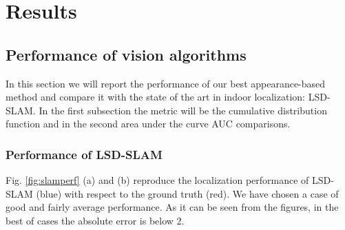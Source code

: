 \section{Results}
\label{sec:results}

\subsection{Performance of vision algorithms}
In this section we will report the performance of our best appearance-based method and compare it with the state of the art in indoor localization: LSD-SLAM. In the first subsection the metric will be the cumulative distribution function and in the second area under the curve AUC comparisons.

\subsubsection{Performance of LSD-SLAM}

Fig. \ref{fig:slamperf} (a) and (b) reproduce the localization performance of LSD-SLAM (blue) with respect to the ground truth (red). We have chosen a case of good and fairly average performance. As it can be seen from the figures, in the best of cases the absolute error is below 2. 

